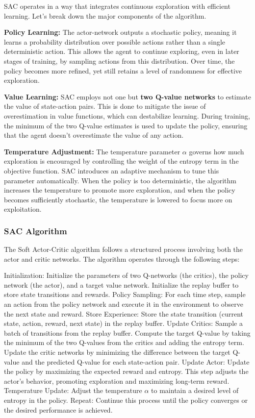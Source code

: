 SAC operates in a way that integrates continuous exploration with efficient learning. Let’s break down the major components of the algorithm.

\textbf{Policy Learning:} The actor-network outputs a stochastic policy, meaning it learns a probability distribution over possible actions rather than a single deterministic action. This allows the agent to continue exploring, even in later stages of training, by sampling actions from this distribution. Over time, the policy becomes more refined, yet still retains a level of randomness for effective exploration.

\textbf{Value Learning:} SAC employs not one but \textbf{two Q-value networks} to estimate the value of state-action pairs. This is done to mitigate the issue of overestimation in value functions, which can destabilize learning. During training, the minimum of the two Q-value estimates is used to update the policy, ensuring that the agent doesn’t overestimate the value of any action.

\textbf{Temperature Adjustment:} The temperature parameter $\alpha$ governs how much exploration is encouraged by controlling the weight of the entropy term in the objective function. SAC introduces an adaptive mechanism to tune this parameter automatically. When the policy is too deterministic, the algorithm increases the temperature to promote more exploration, and when the policy becomes sufficiently stochastic, the temperature is lowered to focus more on exploitation.

\subsubsection*{SAC Algorithm}

The Soft Actor-Critic algorithm follows a structured process involving both the actor and critic networks. The algorithm operates through the following steps:

Initialization:
Initialize the parameters of two Q-networks (the critics), the policy network (the actor), and a target value network.
Initialize the replay buffer to store state transitions and rewards.
Policy Sampling:
For each time step, sample an action from the policy network and execute it in the environment to observe the next state and reward.
Store Experience:
Store the state transition (current state, action, reward, next state) in the replay buffer.
Update Critics:
Sample a batch of transitions from the replay buffer.
Compute the target Q-value by taking the minimum of the two Q-values from the critics and adding the entropy term.
Update the critic networks by minimizing the difference between the target Q-value and the predicted Q-value for each state-action pair.
Update Actor:
Update the policy by maximizing the expected reward and entropy. This step adjusts the actor’s behavior, promoting exploration and maximizing long-term reward.
Temperature Update:
Adjust the temperature $\alpha$ to maintain a desired level of entropy in the policy.
Repeat:
Continue this process until the policy converges or the desired performance is achieved.
